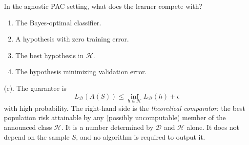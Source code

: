 \begin{exercise}
\label{ex:mlu-agnostic-mcq}
In the agnostic PAC setting, what does the learner compete with?
\begin{enumerate}[label=(\alph*)]
    \item The Bayes-optimal classifier.
    \item A hypothesis with zero training error.
    \item The best hypothesis in $\mathcal{H}$.
    \item The hypothesis minimizing validation error.
\end{enumerate}
\end{exercise}

\begin{solution}
(c). The guarantee is
\[
L_{\mathcal{D}}(A(S))
\le
\inf_{h\in\mathcal{H}}L_{\mathcal{D}}(h)+\epsilon
\]
with high probability. The right-hand side is the \emph{theoretical comparator}: the best population risk attainable by any (possibly uncomputable) member of the announced class $\mathcal{H}$. It is a number determined by $\mathcal{D}$ and $\mathcal{H}$ alone. It does not depend on the sample $S$, and no algorithm is required to output it.


\end{solution}
